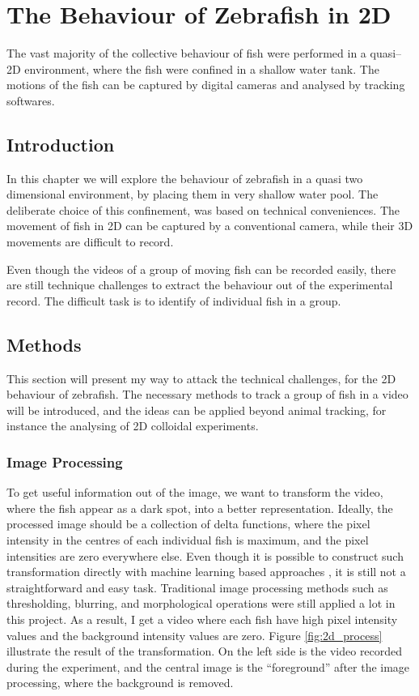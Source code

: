 \documentclass[11pt,twoside]{report}
\begin{document}
\chapter{The Behaviour of Zebrafish in 2D}
\label{chapter:fish_2d}

The vast majority of the collective behaviour of fish were performed in a quasi--2D environment, where the fish were confined in a shallow water tank. The motions of the fish can be captured by digital cameras and analysed by tracking softwares.

\section{Introduction}

In this chapter we will explore the behaviour of zebrafish in a quasi two dimensional environment, by placing them in very shallow water pool. The deliberate choice of this confinement, was based on technical conveniences. The movement of fish in 2D can be captured by a conventional camera, while their 3D movements are difficult to record.

Even though the videos of a group of moving fish can be recorded easily, there are still technique challenges to extract the behaviour out of the experimental record. The difficult task is to identify of individual fish in a group.


\section{Methods}

This section will present my way to attack the technical challenges, for the 2D behaviour of zebrafish. The necessary methods to track a group of fish in a video will be introduced, and the ideas can be applied beyond animal tracking, for instance the analysing of 2D colloidal experiments.

\subsection{Image Processing}
\label{section:image_process}

To get useful information out of the image, we want to transform the video, where the fish appear as a dark spot, into a better representation. Ideally, the processed image should be a collection of delta functions, where the pixel intensity in the centres of each individual fish is maximum, and the pixel intensities are zero everywhere else. Even though it is possible to construct such transformation directly with machine learning based approaches \cite{newby2018}, it is still not a straightforward and easy task. Traditional image processing methods such as thresholding, blurring, and morphological operations were still applied a lot in this project. As a result, I get a video where each fish have high pixel intensity values and the background intensity values are zero. Figure \ref{fig:2d_process} illustrate the result of the transformation. On the left side is the video recorded during the experiment, and the central image is the ``foreground'' after the image processing, where the background is removed.
\end{document}
